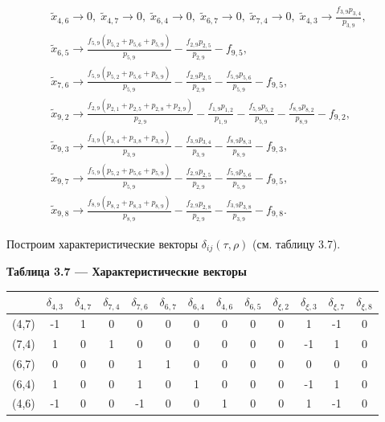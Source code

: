 \documentclass[14pt]{extarticle}%
\begin{document}
\begin{equation*}
\begin{gathered}
\tilde{x}_{4,6}\to 0,\;
\tilde{x}_{4,7}\to 0,\;
\tilde{x}_{6,4}\to 0,\;
\tilde{x}_{6,7}\to 0,\;
\tilde{x}_{7,4}\to 0,\;
\tilde{x}_{4,3}\to \frac{f_{3,9} p_{3,4}}{p_{3,9}},\\
\tilde{x}_{6,5}\to \frac{f_{5,9} \left(p_{5,2}+p_{5,6}+p_{5,9}\right)}{p_{5,9}}-\frac{f_{2,9} p_{2,5}}{p_{2,9}}-f_{9,5},\\
\tilde{x}_{7,6}\to \frac{f_{5,9} \left(p_{5,2}+p_{5,6}+p_{5,9}\right)}{p_{5,9}}-\frac{f_{2,9} p_{2,5}}{p_{2,9}}-\frac{f_{5,9} p_{5,6}}{p_{5,9}}-f_{9,5},\\
\tilde{x}_{9,2}\to \frac{f_{2,9} \left(p_{2,1}+p_{2,5}+p_{2,8}+p_{2,9}\right)}{p_{2,9}}-\frac{f_{1,9} p_{1,2}}{p_{1,9}}-\frac{f_{5,9} p_{5,2}}{p_{5,9}}-\frac{f_{8,9} p_{8,2}}{p_{8,9}}-f_{9,2},\\
\tilde{x}_{9,3}\to \frac{f_{3,9} \left(p_{3,4}+p_{3,8}+p_{3,9}\right)}{p_{3,9}}-\frac{f_{3,9} p_{3,4}}{p_{3,9}}-\frac{f_{8,9} p_{8,3}}{p_{8,9}}-f_{9,3},\\
\tilde{x}_{9,7}\to \frac{f_{5,9} \left(p_{5,2}+p_{5,6}+p_{5,9}\right)}{p_{5,9}}-\frac{f_{2,9} p_{2,5}}{p_{2,9}}-\frac{f_{5,9} p_{5,6}}{p_{5,9}}-f_{9,5},\\
\tilde{x}_{9,8}\to \frac{f_{8,9} \left(p_{8,2}+p_{8,3}+p_{8,9}\right)}{p_{8,9}}-\frac{f_{2,9} p_{2,8}}{p_{2,9}}-\frac{f_{3,9} p_{3,8}}{p_{3,9}}-f_{9,8}.
\end{gathered}
\end{equation*}

Построим характеристические векторы $\delta_{ij}(\tau,\rho)$ (см. таблицу 3.7).

\begin{center}
\textbf{Таблица 3.7 --- Характеристические векторы }\\
\begin{tabular}{c|cccccccccccc}
 & $\delta _{4,3}$ & $\delta _{4,7}$ & $\delta _{7,4}$ & $\delta _{7,6}$ & $\delta _{6,7}$ & $\delta _{6,4}$ & $\delta _{4,6}$ & $\delta _{6,5}$ & $\delta _{\xi,2}$ & $\delta _{\xi,3}$ & $\delta _{\xi,7}$ & $\delta _{\xi,8}$ \\\hline
 (4,7)& -1 & 1 & 0 & 0 & 0 & 0 & 0 & 0 & 0 & 1 & -1 & 0 \\
 (7,4)&1 & 0 & 1 & 0 & 0 & 0 & 0 & 0 & 0 & -1 & 1 & 0 \\
 (6,7)&0 & 0 & 0 & 1 & 1 & 0 & 0 & 0 & 0 & 0 & 0 & 0 \\
 (6,4)&1 & 0 & 0 & 1 & 0 & 1 & 0 & 0 & 0 & -1 & 1 & 0 \\
 (4,6)&-1 & 0 & 0 & -1 & 0 & 0 & 1 & 0 & 0 & 1 & -1 & 0 
\end{tabular}
\end{center}
\end{document}
